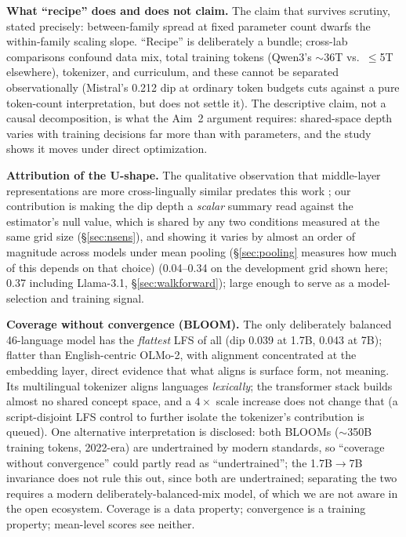 \documentclass[11pt,a4paper]{article}
\begin{document}
\textbf{What ``recipe'' does and does not claim.} The claim that survives
scrutiny, stated precisely: between-family spread at fixed parameter count
dwarfs the within-family scaling slope. ``Recipe'' is deliberately a bundle; cross-lab comparisons confound data mix, total training tokens
(Qwen3's $\sim$36T vs.\ $\leq$5T elsewhere), tokenizer, and curriculum, and
these cannot be separated observationally (Mistral's 0.212 dip at ordinary
token budgets cuts against a pure token-count interpretation, but does not settle
it). The descriptive claim, not a causal decomposition, is what the Aim~2
argument requires: shared-space depth varies with training decisions far more
than with parameters, and the study shows it moves under direct optimization.

\textbf{Attribution of the U-shape.} The qualitative observation that
middle-layer representations are more cross-lingually similar predates this
work \citep{shani2025shared,wendler2024llamas}; our contribution is making the
dip depth a \emph{scalar} summary read against the estimator's null
value, which is shared by any two conditions measured at the same grid size
(\S\ref{sec:nsens}), and showing it varies by
almost an order of magnitude across models under mean pooling
(\S\ref{sec:pooling} measures how much of this depends on that choice)
(0.04--0.34 on the development
grid shown here; 0.37 including Llama-3.1, \S\ref{sec:walkforward}); large
enough to
serve as a model-selection and training signal.

\textbf{Coverage without convergence (BLOOM).} The only deliberately
balanced 46-language model has the \emph{flattest} LFS of all (dip 0.039 at
1.7B, 0.043 at 7B); flatter than English-centric OLMo-2, with alignment
concentrated at the embedding layer, direct evidence that what aligns is
surface form, not meaning. Its multilingual tokenizer aligns languages
\emph{lexically}; the transformer stack builds almost no shared concept
space, and a $4\times$ scale increase does not change that (a
script-disjoint LFS control to further isolate the tokenizer's contribution
is queued). One alternative interpretation is disclosed: both BLOOMs
($\sim$350B training tokens, 2022-era) are undertrained by modern standards,
so ``coverage without convergence'' could partly read as ``undertrained''; the 1.7B$\to$7B invariance does not rule this out, since both are
undertrained; separating the two requires a modern deliberately-balanced-mix
model, of which we are not aware in the open ecosystem. Coverage
is a data property; convergence is a training property; mean-level scores
see neither.
\end{document}
